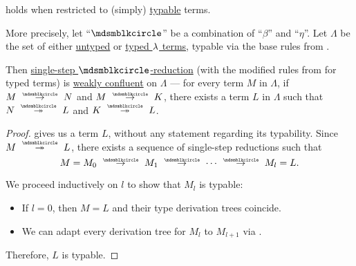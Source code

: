 \begin{proposition}\label{thm:simply_typed_church_rosser_theorem}
   holds when restricted to (simply) \hyperref[def:typability]{typable} terms.

  More precisely, let \enquote{\( {\Anon} \)} be a combination of \enquote{\( \beta \)} and \enquote{\( \eta \)}. Let \( \Lambda \) be the set of either \hyperref[def:lambda_term]{untyped} or \hyperref[def:typed_lambda_term]{typed \( \mathrm{\lambda} \) terms}, typable via the base rules from .

  Then \hyperref[def:lambda_term_reduction/single]{single-step \( \Anon \)-reduction} (with the modified rules from  for typed terms) is \hyperref[def:reduction_confluence]{weakly confluent} on \( \Lambda \) --- for every term \( M \) in \( \Lambda \), if \( M \pred N \) and \( M \pred K \), there exists a term \( L \) in \( \Lambda \) such that \( N \pred* L \) and \( K \pred* L \).
\end{proposition}
\begin{proof}
   gives us a term \( L \), without any statement regarding its typability. Since \( M \pred* L \), there exists a sequence of single-step reductions such that
  \begin{equation*}
    M = M_0 \pred M_1 \pred \cdots \pred M_l = L.
  \end{equation*}

  We proceed inductively on \( l \) to show that \( M_l \) is typable:
  \begin{itemize}
    \item If \( l = 0 \), then \( M = L \) and their type derivation trees coincide.
    \item We can adapt every derivation tree for \( M_l \) to \( M_{l+1} \) via .
  \end{itemize}

  Therefore, \( L \) is typable.
\end{proof}
